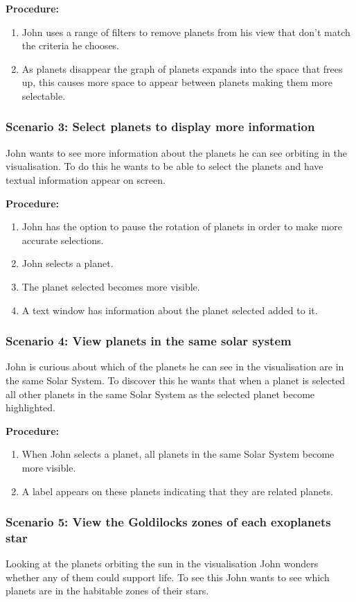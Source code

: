   {\bf Procedure:}
  \begin{enumerate}
 \item John uses a range of filters to remove planets from his view that don't
match the criteria he chooses.
\item As planets disappear the graph of planets expands into the space that
frees up, this causes more space to appear between planets making them more
selectable.
 \end{enumerate}
 
  \subsubsection{Scenario 3: Select planets to display more information}
 John wants to see more information about the planets he can see
orbiting in the visualisation. To do this he wants to be able to select the
planets and have textual information appear on screen.
 
  {\bf  Procedure:}
   \begin{enumerate}
 \item John has the option to pause the rotation of planets in order to make
more accurate selections. 
 \item John selects a planet.
\item The planet selected becomes more visible.
\item A text window has information about the planet selected added
to it.
 \end{enumerate}
 
 \subsubsection{Scenario 4: View planets in the same solar system}
John is curious about which of the planets he can see in the
visualisation are in the same Solar System. To discover this he wants that when
a planet is selected all other planets in the same Solar System as the selected
planet become highlighted.
 
  {\bf  Procedure:}
   \begin{enumerate}
 \item When John selects a planet, all planets in the same Solar System become
more visible.
 \item A label appears on these planets indicating that they are related
planets.
 \end{enumerate}
 
  
 \subsubsection{Scenario 5: View the Goldilocks zones of each exoplanets star}
   Looking at the planets orbiting the sun in the visualisation John wonders
whether any of them could support life. To see this John wants to see which
planets are in the habitable zones of their stars. 
 
